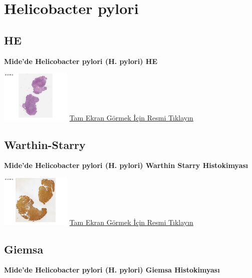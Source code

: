 \documentclass[
  letterpaper,
  DIV=11,
  numbers=noendperiod]{scrreprt}
\begin{document}
\hypertarget{sec-helicobacter-pylori}{%
\section{Helicobacter pylori}\label{sec-helicobacter-pylori}}

\hypertarget{he-4}{%
\subsection{HE}\label{he-4}}

\textbf{Mide'de Helicobacter pylori (H. pylori) HE}

\href{https://images.patolojiatlasi.com/helicobacterpylori/HE.html}{\includegraphics[width=0.25\textwidth,height=\textheight]{./screenshots/thumbnail_helicobacterpylori.png}}
\href{https://images.patolojiatlasi.com/helicobacterpylori/HE.html}{Tam
Ekran Görmek İçin Resmi Tıklayın}

\hypertarget{warthin-starry}{%
\subsection{Warthin-Starry}\label{warthin-starry}}

\textbf{Mide'de Helicobacter pylori (H. pylori) Warthin Starry
Histokimyası}

\href{https://images.patolojiatlasi.com/helicobacterpylori/warthinstarry.html}{\includegraphics[width=0.25\textwidth,height=\textheight]{./screenshots/thumbnail_helicobacterpyloriWS.png}}
\href{https://images.patolojiatlasi.com/helicobacterpylori/warthinstarry.html}{Tam
Ekran Görmek İçin Resmi Tıklayın}

\hypertarget{giemsa}{%
\subsection{Giemsa}\label{giemsa}}

\textbf{Mide'de Helicobacter pylori (H. pylori) Giemsa Histokimyası}
\end{document}
